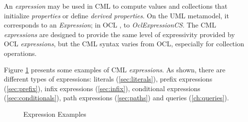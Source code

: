\begin{definition}
An \emph{expression} may be used in CML to compute values and collections that initialize \emph{properties} or define \emph{derived properties}.
On the UML \cite{uml} metamodel,
it corresponds to an \emph{Expression};
in OCL \cite{ocl}, to \emph{OclExpressionCS}.
The CML \emph{expressions} are designed to provide the same level of
expressivity provided by OCL \emph{expressions},
but the CML syntax varies from OCL, especially for collection operations.
\end{definition}

\begin{examples}
Figure \ref{fig:ex:expressions} presents some examples of CML \emph{expressions}.
As shown, there are different types of expressions:
literals (\ref{sec:literals}),
prefix expressions (\ref{sec:prefix}),
infix expressions (\ref{sec:infix}),
conditional expressions (\ref{sec:conditionals}),
path expressions (\ref{sec:paths})
and queries (\ref{ch:queries}).
\end{examples}

\begin{figure}
\verbatimfont{\small}
\begin{framed}

\end{framed}
\caption{Expression Examples}
\label{fig:ex:expressions}
\end{figure}
